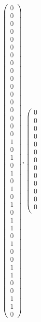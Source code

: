 \documentclass[8pt]{article}
\begin{document}
 \newline \begin{align*}
 \left(\begin{array}{r}
0 \\
0 \\
0 \\
0 \\
0 \\
0 \\
0 \\
0 \\
0 \\
0 \\
0 \\
0 \\
0 \\
0 \\
0 \\
0 \\
0 \\
1 \\
0 \\
1 \\
0 \\
1 \\
0 \\
1 \\
0 \\
1 \\
0 \\
1 \\
1 \\
0 \\
1 \\
0 \\
0 \\
1 \\
1 \\
0 \\
0 \\
1 \\
1 \\
0
\end{array}\right) ,
 \left(\begin{array}{r}
0 \\
0 \\
0 \\
0 \\
0 \\
0 \\
0 \\
0 \\
0 \\
0 \\
0 \\
0 \\
0 \\

\end{array}
\end{align*}
\end{document}
